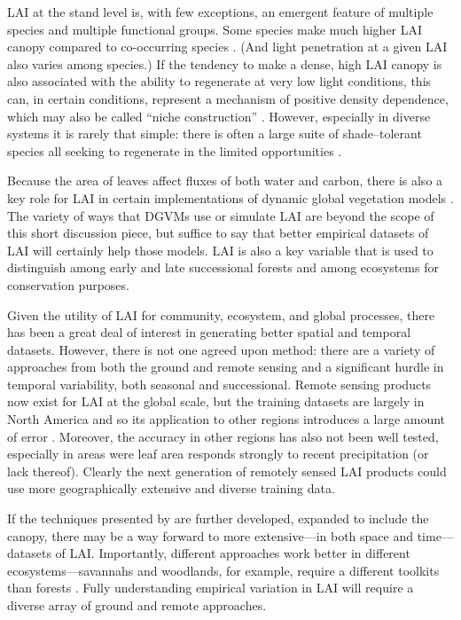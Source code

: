 \documentclass[11pt]{article}
\begin{document}
    LAI at the stand level is, with few exceptions, an emergent feature of multiple species and multiple functional groups.  Some species make much higher LAI canopy compared to co-occurring species  \citep{kassnacht1997interrelationships}.   (And light penetration at a given LAI also varies among species.)  If the tendency to make a dense, high LAI canopy is also associated with the ability to regenerate at very low light conditions, this can, in certain conditions, represent a mechanism of positive density dependence, which may also be called ``niche construction'' \citep[\emph{sensu}][]{odling2003niche}.  However, especially in diverse systems it is rarely that simple: there is often a large suite of shade--tolerant species all seeking to regenerate in the limited opportunities \citep{valladares2008shade}.  
	
	Because the area of leaves affect fluxes of both water and carbon, there is also a key role for LAI in certain implementations of dynamic global vegetation models \citep[DGVMs, e.g.][]{murray2013evaluation}.  The variety of ways that DGVMs use or simulate LAI are beyond the scope of this short discussion piece, but suffice to say that better empirical datasets of LAI will certainly help those models.  LAI is also a key variable that is used to distinguish among early and late successional forests and among ecosystems for conservation purposes.  
	
	Given the utility of LAI for community, ecosystem, and global processes, there has been a great deal of interest in generating better spatial and temporal datasets.  However, there is not one agreed upon method: there are a variety of approaches from both the ground and remote sensing \citep{jonckheere2004review, breda2003ground} and a significant hurdle in temporal variability, both seasonal and successional.  Remote sensing products now exist for LAI at the global scale, but the training datasets are largely in North America and so its application to other regions introduces a large amount of error \citep[e.g. for Australia see][]{hill2006assessment}.  Moreover, the accuracy in other regions has also not been well tested, especially in areas were leaf area responds strongly to recent precipitation (or lack thereof).  Clearly the next generation of remotely sensed LAI products could use more geographically extensive and diverse training data.  
	
 If the techniques presented by \cite{dobert2015can} are further developed, expanded to include the canopy, there may be a way forward to more extensive---in both space and time---datasets of LAI.  Importantly, different approaches work better in different ecosystems---savannahs and woodlands, for example, require a different toolkits than forests \citep{fuentes2008automated, sea2011documenting}.  Fully understanding empirical variation in LAI will require a diverse array of ground and remote approaches.  
	
	
	
	
\end{document}
